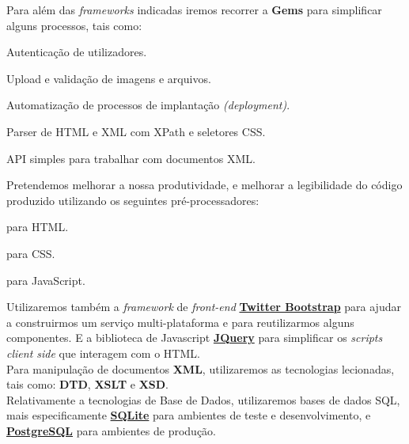 Para além das \textit{frameworks} indicadas iremos recorrer a \textbf{Gems} para simplificar alguns processos, tais como:

\begin{description}[labelindent=1cm]
  \item[Devise] Autenticação de utilizadores.
  \item[Paperclip] Upload e validação de imagens e arquivos.
  \item[Capistrano] Automatização de processos de implantação \textit{(deployment)}.
  \item[Nokogiri] Parser de HTML e XML com XPath e seletores CSS.
  \item[XML-Simple] API simples para trabalhar com documentos XML.
\end{description} 

Pretendemos melhorar a nossa produtividade, e melhorar a legibilidade do código produzido utilizando os seguintes pré-processadores:

\begin{description}[labelindent=1cm]
  \item[\href{http://slim-lang.com/}{Slim}] para HTML.
  \item[\href{http://sass-lang.com/}{SASS}] para CSS.
  \item[\href{http://coffeescript.org/}{CoffeeScript}] para JavaScript.
\end{description} 

Utilizaremos também a \textit{framework} de \textit{front-end} \href{http://getbootstrap.com/}{\textbf{Twitter Bootstrap}} 
para ajudar a construirmos um serviço multi-plataforma e para reutilizarmos alguns componentes. 
E a biblioteca de Javascript \href{http://jquery.com/}{\textbf{JQuery}} para simplificar os \textit{scripts client side} que interagem com o HTML.\\

Para manipulação de documentos \textbf{XML}, utilizaremos as tecnologias lecionadas, tais como: \textbf{DTD}, \textbf{XSLT} e \textbf{XSD}.\\

Relativamente a tecnologias de Base de Dados, utilizaremos bases de dados SQL, mais especificamente \href{http://www.sqlite.org/}{\textbf{SQLite}} 
para ambientes de teste e desenvolvimento, e \href{http://www.postgresql.org/}{\textbf{PostgreSQL}} para ambientes de produção.



